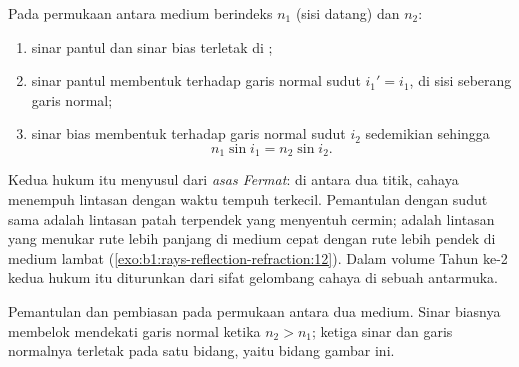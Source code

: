 \begin{theorem}\label{thm:b1:rays-reflection-refraction:snell}
Pada permukaan antara medium berindeks $n_1$ (sisi datang) dan
$n_2$:
\begin{enumerate}
  \item sinar pantul dan sinar bias terletak di ;
  \item sinar pantul membentuk terhadap garis normal sudut $i_1' = i_1$,
        di sisi seberang garis normal;
  \item sinar bias membentuk terhadap garis normal sudut $i_2$ sedemikian
        sehingga
        \[
        n_1 \sin i_1 = n_2 \sin i_2 .
        \]
\end{enumerate}
\end{theorem}
\admitted

\begin{remark}\label{rem:b1:rays-reflection-refraction:fermat}
Kedua hukum itu menyusul dari \emph{asas Fermat}: di antara dua titik,
cahaya menempuh lintasan dengan waktu tempuh terkecil. Pemantulan dengan
sudut sama adalah lintasan patah terpendek yang menyentuh cermin;  adalah lintasan yang menukar rute lebih panjang di medium cepat
dengan rute lebih pendek di medium lambat
(\cref{exo:b1:rays-reflection-refraction:12}). Dalam volume Tahun ke-2
kedua hukum itu diturunkan dari sifat gelombang cahaya di sebuah antarmuka.
\end{remark}

\begin{omfigure}

{\small Pemantulan dan pembiasan pada permukaan antara dua medium.
Sinar biasnya membelok mendekati garis normal ketika $n_2 > n_1$;
ketiga sinar dan garis normalnya terletak pada satu bidang, yaitu
bidang gambar ini.}
\end{omfigure}

